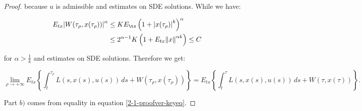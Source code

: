 \begin{theorem}
\begin{proof}
        because $u$ is admissible and estimates on SDE solutions. While we have:

        \begin{align}
            E_{tx}\abs{W(\tau_{\rho},x(\tau_{\rho}))}^{\alpha} & \leq KE_{\tx}\left(1+\abs{x(\tau_{\rho})}^k\right)^{\alpha} \\
            & \leq 2^{\alpha-1}K\left(1+E_{tx}\norm{x}^{\alpha k}\right) \leq C
        \end{align}

        for $\alpha>\frac{1}{k}$ and estimates on SDE solutions. Therefore we get:

        \begin{equation}
            \lim_{\rho\to+\infty} E_{tx}\left\{\int_t^{\tau_{\rho}} L(s,x(s),u(s))\,ds + W(\tau_{\rho},x(\tau_{\rho}))\right\} = E_{tx}\left\{\int_t^{\tau} L(s,x(s),u(s))\,ds + W(\tau,x(\tau))\right\}.
        \end{equation}

        Part $b)$ comes from equality in equation \ref{2-1-proofver-keyeq}.
    \end{proof}
\end{theorem}





